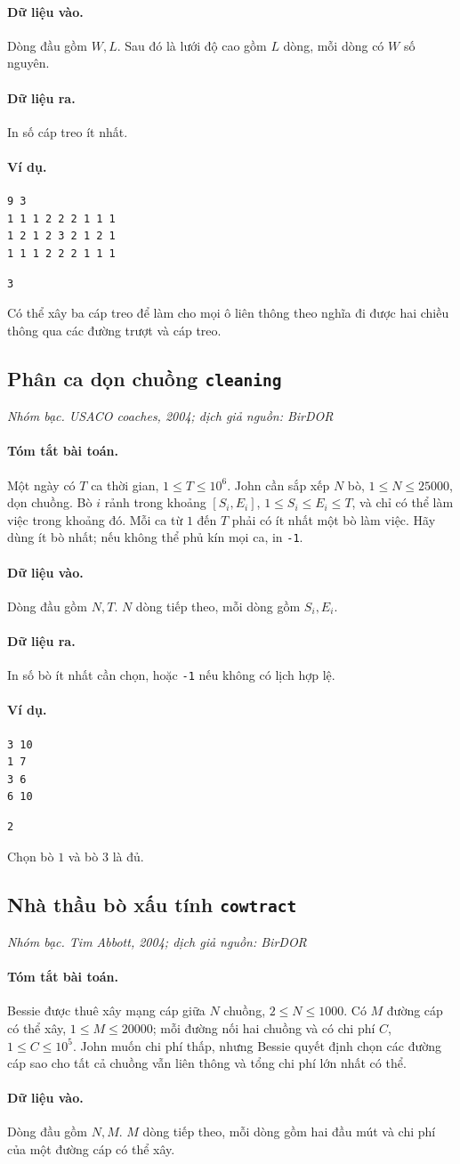 \documentclass[11pt]{article}
\newcommand{\problem}[4]{%
  \subsection[#1 (#2)]{#1 \hfill {\normalsize\texttt{#2}}}%
  \noindent\textit{#3. #4}\par\smallskip
}
\newcommand{\iosec}[1]{\paragraph{#1}}
\begin{document}
\iosec{Dữ liệu vào.}
Dòng đầu gồm \(W,L\). Sau đó là lưới độ cao gồm \(L\) dòng, mỗi dòng có
\(W\) số nguyên.

\iosec{Dữ liệu ra.}
In số cáp treo ít nhất.

\iosec{Ví dụ.}
\begin{verbatim}
9 3
1 1 1 2 2 2 1 1 1
1 2 1 2 3 2 1 2 1
1 1 1 2 2 2 1 1 1
\end{verbatim}

\begin{verbatim}
3
\end{verbatim}

Có thể xây ba cáp treo để làm cho mọi ô liên thông theo nghĩa đi được hai
chiều thông qua các đường trượt và cáp treo.

\problem{Phân ca dọn chuồng}{cleaning}{Nhóm bạc}{USACO coaches, 2004; dịch giả nguồn: BirDOR}

\iosec{Tóm tắt bài toán.}
Một ngày có \(T\) ca thời gian, \(1\le T\le 10^6\). John cần sắp xếp
\(N\) bò, \(1\le N\le 25000\), dọn chuồng. Bò \(i\) rảnh trong khoảng
\([S_i,E_i]\), \(1\le S_i\le E_i\le T\), và chỉ có thể làm việc trong khoảng
đó. Mỗi ca từ \(1\) đến \(T\) phải có ít nhất một bò làm việc. Hãy dùng ít bò
nhất; nếu không thể phủ kín mọi ca, in \texttt{-1}.

\iosec{Dữ liệu vào.}
Dòng đầu gồm \(N,T\). \(N\) dòng tiếp theo, mỗi dòng gồm \(S_i,E_i\).

\iosec{Dữ liệu ra.}
In số bò ít nhất cần chọn, hoặc \texttt{-1} nếu không có lịch hợp lệ.

\iosec{Ví dụ.}
\begin{verbatim}
3 10
1 7
3 6
6 10
\end{verbatim}

\begin{verbatim}
2
\end{verbatim}

Chọn bò \(1\) và bò \(3\) là đủ.

\problem{Nhà thầu bò xấu tính}{cowtract}{Nhóm bạc}{Tim Abbott, 2004; dịch giả nguồn: BirDOR}

\iosec{Tóm tắt bài toán.}
Bessie được thuê xây mạng cáp giữa \(N\) chuồng, \(2\le N\le 1000\). Có
\(M\) đường cáp có thể xây, \(1\le M\le 20000\); mỗi đường nối hai chuồng và có
chi phí \(C\), \(1\le C\le 10^5\). John muốn chi phí thấp, nhưng Bessie quyết
định chọn các đường cáp sao cho tất cả chuồng vẫn liên thông và tổng chi phí
lớn nhất có thể.

\iosec{Dữ liệu vào.}
Dòng đầu gồm \(N,M\). \(M\) dòng tiếp theo, mỗi dòng gồm hai đầu mút và chi
phí của một đường cáp có thể xây.
\end{document}
